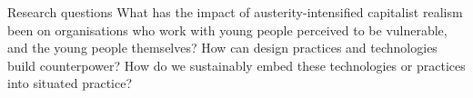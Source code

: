
Research questions
What has the impact of austerity-intensified capitalist realism been on organisations who work with young people perceived to be vulnerable, and the young people themselves?
How can design practices and technologies build counterpower?
How do we sustainably embed these technologies or practices into situated practice?